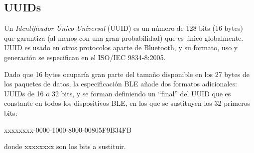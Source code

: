 \subsection{UUIDs}
\label{makereference2.4.3}

Un \textit{Identificador Único Universal} (UUID) es un número de 128 bits (16 bytes) que garantiza (al menos con una gran probabilidad) que es único globalmente. UUID es usado en otros protocolos aparte de Bluetooth, y su formato, uso y generación se especifican en el ISO/IEC 9834-8:2005.

Dado que 16 bytes ocuparía gran parte del tamaño disponible en los 27 bytes de los paquetes de datos, la especificación BLE añade dos formatos adicionales: UUIDs de 16 o 32 bits, y se forman definiendo un “final” del UUID que es constante en todos los dispositivos BLE, en los que se sustituyen los 32 primeros bits:

\begin{center}xxxxxxxx-0000-1000-8000-00805F9B34FB\end{center}

donde xxxxxxxx son los bits a sustituir.




